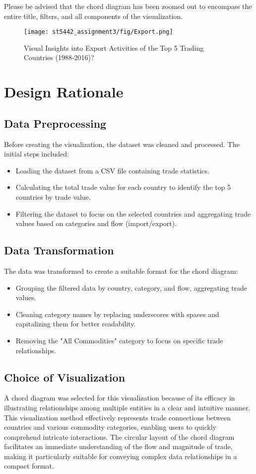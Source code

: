 \documentclass{article}
\begin{document}
Please be advised that the chord diagram has been zoomed out to encompass the entire title, filters, and all components of the visualization.

\begin{figure}[ht] 
    \centering
    \texttt{[image: st5442\_assignment3/fig/Export.png]}
    \caption{
        Visual Insights into Export Activities of the Top 5 Trading Countries (1988-2016)?
    }
    \label{fig:Export}
\end{figure}

\newpage

\section{Design Rationale}

\subsection{Data Preprocessing}
Before creating the visualization, the dataset was cleaned and processed. The initial steps included:
\begin{itemize}
    \item Loading the dataset from a CSV file containing trade statistics.
    \item Calculating the total trade value for each country to identify the top 5 countries by trade value.
    \item Filtering the dataset to focus on the selected countries and aggregating trade values based on categories and flow (import/export).
\end{itemize}

\subsection{Data Transformation}
The data was transformed to create a suitable format for the chord diagram:
\begin{itemize}
    \item Grouping the filtered data by country, category, and flow, aggregating trade values.
    \item Cleaning category names by replacing underscores with spaces and capitalizing them for better readability.
    \item Removing the "All Commodities" category to focus on specific trade relationships.
\end{itemize}

\subsection{Choice of Visualization}
A chord diagram\cite{chord} was selected for this visualization because of its efficacy in illustrating relationships among multiple entities in a clear and intuitive manner. This visualization method effectively represents trade connections between countries and various commodity categories, enabling users to quickly comprehend intricate interactions. The circular layout of the chord diagram facilitates an immediate understanding of the flow and magnitude of trade, making it particularly suitable for conveying complex data relationships in a compact format. 
\end{document}
